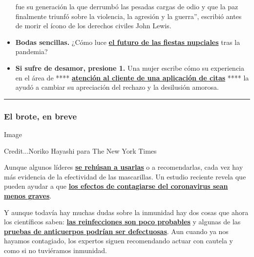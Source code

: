 \begin{itemize}
  fue su generación la que derrumbó las pesadas cargas de odio y que la
  paz finalmente triunfó sobre la violencia, la agresión y la guerra'',
  escribió antes de morir el ícono de los derechos civiles John Lewis.
\item
  \textbf{Bodas sencillas.} ¿Cómo luce
  \textbf{\href{https://www.nytimes3xbfgragh.onion/es/2020/07/18/espanol/estilos-de-vida/bodas-coronavirus.html}{el
  futuro de las fiestas nupciales}} tras la pandemia?
\item
  \textbf{Si sufre de desamor, presione 1.} Una mujer escribe cómo su
  experiencia en el área de ****
  \textbf{\href{https://www.nytimes3xbfgragh.onion/es/2020/07/26/espanol/estilos-de-vida/citas-en-linea-amor.html}{atención
  al cliente de una aplicación de citas}} **** la ayudó a cambiar su
  apreciación del rechazo y la desilusión amorosa.
\end{itemize}

\begin{center}\rule{0.5\linewidth}{\linethickness}\end{center}

\hypertarget{el-brote-en-breve}{%
\subsubsection{El brote, en breve}\label{el-brote-en-breve}}

Image

Credit...Noriko Hayashi para The New York Times

Aunque algunos líderes
\textbf{\href{https://www.nytimes3xbfgragh.onion/es/2020/07/30/espanol/opinion/usar-cubrebocas-politica.html}{se
rehúsan a usarlas}} o a recomendarlas, cada vez hay más evidencia de la
efectividad de las mascarillas. Un estudio reciente revela que pueden
ayudar a que
\textbf{\href{https://www.nytimes3xbfgragh.onion/es/2020/07/29/espanol/ciencia-y-tecnologia/proteccion-cubrebocas-coronavirus.html}{los
efectos de contagiarse del coronavirus sean menos graves}}.

Y aunque todavía hay muchas dudas sobre la inmunidad hay dos cosas que
ahora los científicos saben:
\textbf{\href{https://www.nytimes3xbfgragh.onion/es/2020/07/24/espanol/ciencia-y-tecnologia/reinfeccion-coronavirus.html}{las
reinfecciones son poco probables}} y algunas de las
\textbf{\href{https://www.nytimes3xbfgragh.onion/es/2020/07/28/espanol/ciencia-y-tecnologia/anticuerpos-coronavirus-inmunidad.html}{pruebas
de anticuerpos podrían ser defectuosas}}. Aun cuando ya nos hayamos
contagiado, los expertos siguen recomendando actuar con cautela y como
si no tuviéramos inmunidad.

